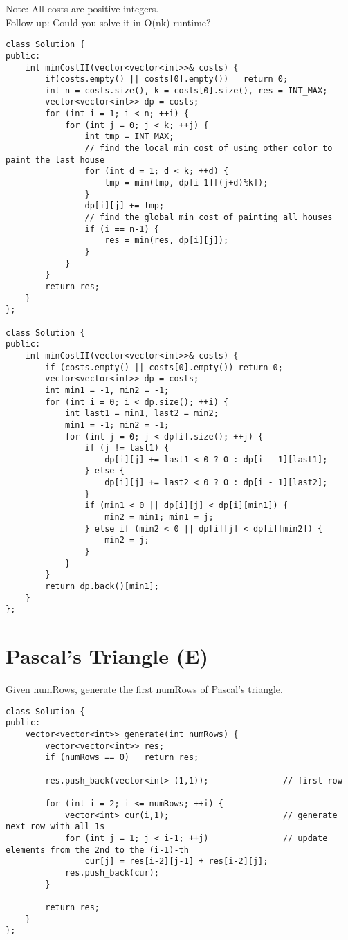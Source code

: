 Note:
All costs are positive integers.\\

Follow up:
Could you solve it in O(nk) runtime?\\

\begin{lstlisting}
class Solution {
public:
    int minCostII(vector<vector<int>>& costs) {
        if(costs.empty() || costs[0].empty())   return 0;
        int n = costs.size(), k = costs[0].size(), res = INT_MAX;
        vector<vector<int>> dp = costs;
        for (int i = 1; i < n; ++i) {
            for (int j = 0; j < k; ++j) {
                int tmp = INT_MAX;
                // find the local min cost of using other color to paint the last house
                for (int d = 1; d < k; ++d) {
                    tmp = min(tmp, dp[i-1][(j+d)%k]);
                }
                dp[i][j] += tmp;
                // find the global min cost of painting all houses
                if (i == n-1) {
                    res = min(res, dp[i][j]);
                }
            }
        }
        return res;
    }
};

class Solution {
public:
    int minCostII(vector<vector<int>>& costs) {
        if (costs.empty() || costs[0].empty()) return 0;
        vector<vector<int>> dp = costs;
        int min1 = -1, min2 = -1;
        for (int i = 0; i < dp.size(); ++i) {
            int last1 = min1, last2 = min2;
            min1 = -1; min2 = -1;
            for (int j = 0; j < dp[i].size(); ++j) {
                if (j != last1) {
                    dp[i][j] += last1 < 0 ? 0 : dp[i - 1][last1];
                } else {
                    dp[i][j] += last2 < 0 ? 0 : dp[i - 1][last2];
                }
                if (min1 < 0 || dp[i][j] < dp[i][min1]) {
                    min2 = min1; min1 = j;
                } else if (min2 < 0 || dp[i][j] < dp[i][min2]) {
                    min2 = j;
                }
            }
        }
        return dp.back()[min1];
    }
};
\end{lstlisting}


\section{Pascal's Triangle (E)}
Given numRows, generate the first numRows of Pascal's triangle. \\

\begin{lstlisting}
class Solution {
public:
    vector<vector<int>> generate(int numRows) {
        vector<vector<int>> res;
        if (numRows == 0)   return res;
        
        res.push_back(vector<int> (1,1));               // first row
        
        for (int i = 2; i <= numRows; ++i) {
            vector<int> cur(i,1);                       // generate next row with all 1s
            for (int j = 1; j < i-1; ++j)               // update elements from the 2nd to the (i-1)-th 
                cur[j] = res[i-2][j-1] + res[i-2][j];
            res.push_back(cur);
        }
        
        return res;
    }
};
\end{lstlisting}


